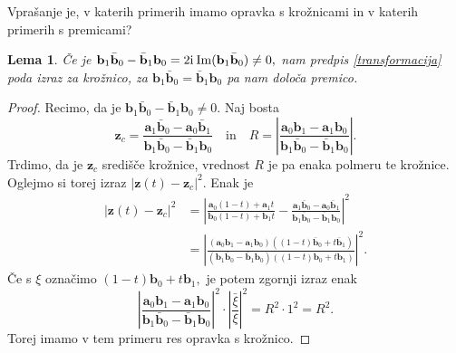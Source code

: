 \documentclass[12pt,a4paper,twoside]{article}
\newcommand{\iu}{\mathrm{i}\mkern1mu} %
\theoremstyle{definition} %
\theoremstyle{plain} %
\newtheorem{lema}[definicija]{Lema}
\theoremstyle{primerstyle}
\numberwithin{equation}{section}  %
\newcommand{\aV}{\mathbf{a}}
\newcommand{\bV}{\mathbf{b}}
\newcommand{\zV}{\mathbf{z}}
\DeclareMathOperator{\ImC}{Im}
\begin{document}
Vprašanje je, v katerih primerih imamo opravka s krožnicami in v katerih primerih s premicami?
\begin{lema}
	\label{z_kroznica_premica}
	Če je $\bV_1\bar{\bV}_0-\bar{\bV}_1\bV_0=2\iu\ImC(\bV_1\bar{\bV}_0)\neq 0,$ nam predpis \eqref{transformacija} poda izraz za krožnico, za $\bV_1\bar{\bV}_0=\bar{\bV}_1\bV_0$ pa nam določa premico.
\end{lema}
\begin{proof}
	Recimo, da je $\bV_1\bar{\bV}_0-\bar{\bV}_1\bV_0\neq 0$. Naj bosta
	\begin{equation*}
		\zV_c=\frac{\aV_1\bar{\bV}_0-\aV_0\bar{\bV}_1}{\bV_1\bar{\bV}_0-\bar{\bV}_1\bV_0}\quad\text{in}\quad R=\left|\frac{\aV_0\bV_1-\aV_1\bV_0}{\bV_1\bar{\bV}_0-\bar{\bV}_1\bV_0}\right|\!.
	\end{equation*}
	Trdimo, da je $\zV_c$ središče krožnice, vrednost $R$ je pa enaka polmeru te krožnice. Oglejmo si torej izraz $|\zV(t)-\zV_c|^2.$ Enak je
	\begin{align*}
		|\zV(t)-\zV_c|^2&=\left|\frac{\aV_0(1-t)+\aV_1t}{\bV_0(1-t)+\bV_1t}-\frac{\aV_1\bar{\bV}_0-\aV_0\bar{\bV}_1}{\bV_1\bar{\bV}_0-\bar{\bV}_1\bV_0}\right|^2\\
		&=\left|\frac{(\aV_0\bV_1-\aV_1\bV_0)((1-t)\bar{\bV}_0+t\bar{\bV}_1)}{(\bV_1\bar{\bV}_0-\bar{\bV}_1\bV_0)((1-t)\bV_0+t\bV_1)}\right|^2\!.
	\end{align*}
	Če s $\xi$ označimo $(1-t)\bV_0+t\bV_1,$ je potem zgornji izraz enak
	\begin{equation*}
		\left|\frac{\aV_0\bV_1-\aV_1\bV_0}{\bV_1\bar{\bV}_0-\bar{\bV}_1\bV_0}\right|^2\cdot\left|\frac{\bar{\xi}}{\xi}\right|^2=R^2\cdot1^2=R^2.
	\end{equation*}
	Torej imamo v tem primeru res opravka s krožnico.


\end{proof}
\end{document}
